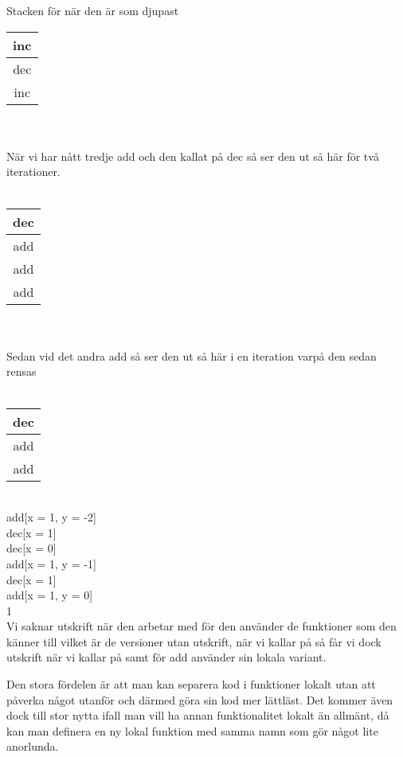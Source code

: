 \Subtask
Stacken för  när den är som djupast

\begin{tabular}{|c|}
\hline
inc \\
\hline
dec\\
\hline
inc \\
\hline
\end{tabular}
\\
\\
När vi har nått tredje add och den kallat på dec så ser den ut så här för två iterationer. 
\\
\\
\begin{tabular}{|c|}

\hline
dec \\
\hline
add \\
\hline
add\\
\hline
add \\
\hline
\end{tabular}
\\
\\
Sedan vid det andra add så ser den ut så här i en iteration varpå den sedan rensas
\\
\\
\begin{tabular}{|c|}

\hline
dec \\
\hline
add \\
\hline
add\\
\hline
\end{tabular}

\Task

\\
add[x = 1, y = -2]\\
dec[x = 1]\\
dec[x = 0]\\
add[x = 1, y = -1]\\
dec[x = 1]\\
add[x = 1, y = 0]\\
1\\
Vi saknar utskrift när den arbetar med  för den använder de funktioner som den känner till vilket är de versioner utan utskrift, när vi kallar på  så får vi dock utskrift när vi kallar på  samt  för add använder sin lokala variant.

\Subtask
Den stora fördelen är att man kan separera kod i funktioner lokalt utan att påverka något utanför och därmed göra sin kod mer lättläst. Det kommer även dock till stor nytta ifall man vill ha annan funktionalitet lokalt än allmänt, då kan man definera en ny lokal funktion med samma namn som gör något lite anorlunda.

